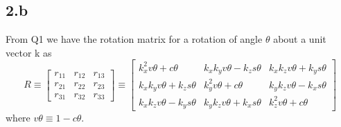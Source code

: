 \documentclass[12pt]{article}
\begin{document}
\subsection*{2.b}
From Q1 we have the rotation matrix for a rotation of angle $\theta$ about a unit vector k as
\[
  R \equiv
  \begin{bmatrix} r_{11} & r_{12} & r_{13} \\ r_{21} & r_{22} & r_{23} \\ r_{31} & r_{32} & r_{33} \end{bmatrix}
  \equiv
  \begin{bmatrix}
    k_x^2v\theta + c\theta & k_xk_yv\theta - k_zs\theta & k_xk_zv\theta + k_ys\theta\\
    k_xk_yv\theta + k_zs\theta & k_y^2v\theta + c\theta & k_yk_zv\theta - k_xs\theta \\
    k_xk_zv\theta - k_ys\theta & k_yk_zv\theta + k_xs\theta & k_z^2v\theta + c\theta
  \end{bmatrix}
\]
where $v\theta \equiv 1 - c\theta$.
\end{document}
